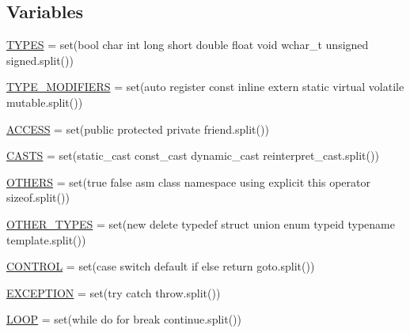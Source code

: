 \subsection*{Variables}
\begin{DoxyCompactItemize}
\item 
\hyperlink{namespacecpp_1_1keywords_a56fd5baf357970548e1ec366edfc2c13}{T\+Y\+P\+ES} = set(\textquotesingle{}bool char int long short double float void wchar\+\_\+t unsigned signed\textquotesingle{}.split())
\item 
\hyperlink{namespacecpp_1_1keywords_af9282ce418d6b4b43dca5ed574caedd7}{T\+Y\+P\+E\+\_\+\+M\+O\+D\+I\+F\+I\+E\+RS} = set(\textquotesingle{}auto register const inline extern static virtual volatile mutable\textquotesingle{}.split())
\item 
\hyperlink{namespacecpp_1_1keywords_a786f41bbea982641425c819d10bb2064}{A\+C\+C\+E\+SS} = set(\textquotesingle{}public protected private friend\textquotesingle{}.split())
\item 
\hyperlink{namespacecpp_1_1keywords_aeba38dc38e188040f4ec44ba05092e7f}{C\+A\+S\+TS} = set(\textquotesingle{}static\+\_\+cast const\+\_\+cast dynamic\+\_\+cast reinterpret\+\_\+cast\textquotesingle{}.split())
\item 
\hyperlink{namespacecpp_1_1keywords_a15fe231fbad145538b73892804898809}{O\+T\+H\+E\+RS} = set(\textquotesingle{}true false asm class namespace using explicit this operator sizeof\textquotesingle{}.split())
\item 
\hyperlink{namespacecpp_1_1keywords_aa86a5e35a3ace14022a5ca1b91baf207}{O\+T\+H\+E\+R\+\_\+\+T\+Y\+P\+ES} = set(\textquotesingle{}new delete typedef struct union enum typeid typename template\textquotesingle{}.split())
\item 
\hyperlink{namespacecpp_1_1keywords_a374dfe9c96681079802ba4724287b8ff}{C\+O\+N\+T\+R\+OL} = set(\textquotesingle{}case switch default if else return goto\textquotesingle{}.split())
\item 
\hyperlink{namespacecpp_1_1keywords_a2665fb8a25a4dae03fa5d3dc975c537c}{E\+X\+C\+E\+P\+T\+I\+ON} = set(\textquotesingle{}try catch throw\textquotesingle{}.split())
\item 
\hyperlink{namespacecpp_1_1keywords_af0164c05398a2291487b76414102d555}{L\+O\+OP} = set(\textquotesingle{}while do for break continue\textquotesingle{}.split())
\item 

\end{DoxyCompactItemize}
